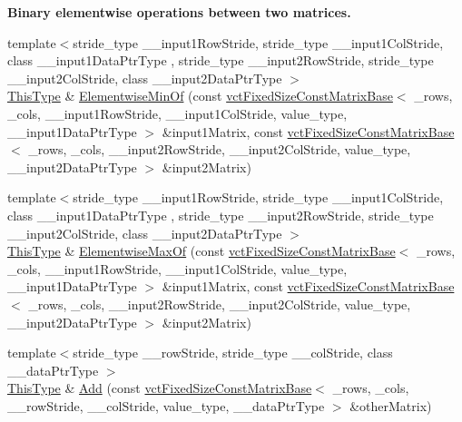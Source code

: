 \begin{Indent}{\bf Binary elementwise operations between two matrices.}
\begin{DoxyCompactItemize}
{\footnotesize template$<$stride\-\_\-type \-\_\-\-\_\-input1\-Row\-Stride, stride\-\_\-type \-\_\-\-\_\-input1\-Col\-Stride, class \-\_\-\-\_\-input1\-Data\-Ptr\-Type , stride\-\_\-type \-\_\-\-\_\-input2\-Row\-Stride, stride\-\_\-type \-\_\-\-\_\-input2\-Col\-Stride, class \-\_\-\-\_\-input2\-Data\-Ptr\-Type $>$ }\\\hyperlink{classvct_fixed_size_const_matrix_base_a7ec66a96ed7e08ce9ff54093133c9d8d}{This\-Type} \& \hyperlink{classvct_fixed_size_matrix_base_aeab7d339ee3999ce62c162e1989425c2}{Elementwise\-Min\-Of} (const \hyperlink{classvct_fixed_size_const_matrix_base}{vct\-Fixed\-Size\-Const\-Matrix\-Base}$<$ \-\_\-rows, \-\_\-cols, \-\_\-\-\_\-input1\-Row\-Stride, \-\_\-\-\_\-input1\-Col\-Stride, value\-\_\-type, \-\_\-\-\_\-input1\-Data\-Ptr\-Type $>$ \&input1\-Matrix, const \hyperlink{classvct_fixed_size_const_matrix_base}{vct\-Fixed\-Size\-Const\-Matrix\-Base}$<$ \-\_\-rows, \-\_\-cols, \-\_\-\-\_\-input2\-Row\-Stride, \-\_\-\-\_\-input2\-Col\-Stride, value\-\_\-type, \-\_\-\-\_\-input2\-Data\-Ptr\-Type $>$ \&input2\-Matrix)
\item 
{\footnotesize template$<$stride\-\_\-type \-\_\-\-\_\-input1\-Row\-Stride, stride\-\_\-type \-\_\-\-\_\-input1\-Col\-Stride, class \-\_\-\-\_\-input1\-Data\-Ptr\-Type , stride\-\_\-type \-\_\-\-\_\-input2\-Row\-Stride, stride\-\_\-type \-\_\-\-\_\-input2\-Col\-Stride, class \-\_\-\-\_\-input2\-Data\-Ptr\-Type $>$ }\\\hyperlink{classvct_fixed_size_const_matrix_base_a7ec66a96ed7e08ce9ff54093133c9d8d}{This\-Type} \& \hyperlink{classvct_fixed_size_matrix_base_aaad8b456c62564f71e5c1528fb9de2fa}{Elementwise\-Max\-Of} (const \hyperlink{classvct_fixed_size_const_matrix_base}{vct\-Fixed\-Size\-Const\-Matrix\-Base}$<$ \-\_\-rows, \-\_\-cols, \-\_\-\-\_\-input1\-Row\-Stride, \-\_\-\-\_\-input1\-Col\-Stride, value\-\_\-type, \-\_\-\-\_\-input1\-Data\-Ptr\-Type $>$ \&input1\-Matrix, const \hyperlink{classvct_fixed_size_const_matrix_base}{vct\-Fixed\-Size\-Const\-Matrix\-Base}$<$ \-\_\-rows, \-\_\-cols, \-\_\-\-\_\-input2\-Row\-Stride, \-\_\-\-\_\-input2\-Col\-Stride, value\-\_\-type, \-\_\-\-\_\-input2\-Data\-Ptr\-Type $>$ \&input2\-Matrix)
\item 
{\footnotesize template$<$stride\-\_\-type \-\_\-\-\_\-row\-Stride, stride\-\_\-type \-\_\-\-\_\-col\-Stride, class \-\_\-\-\_\-data\-Ptr\-Type $>$ }\\\hyperlink{classvct_fixed_size_const_matrix_base_a7ec66a96ed7e08ce9ff54093133c9d8d}{This\-Type} \& \hyperlink{classvct_fixed_size_matrix_base_abce988ebeb16300e57b94545d0cedc34}{Add} (const \hyperlink{classvct_fixed_size_const_matrix_base}{vct\-Fixed\-Size\-Const\-Matrix\-Base}$<$ \-\_\-rows, \-\_\-cols, \-\_\-\-\_\-row\-Stride, \-\_\-\-\_\-col\-Stride, value\-\_\-type, \-\_\-\-\_\-data\-Ptr\-Type $>$ \&other\-Matrix)

\end{DoxyCompactItemize}
\end{Indent}
